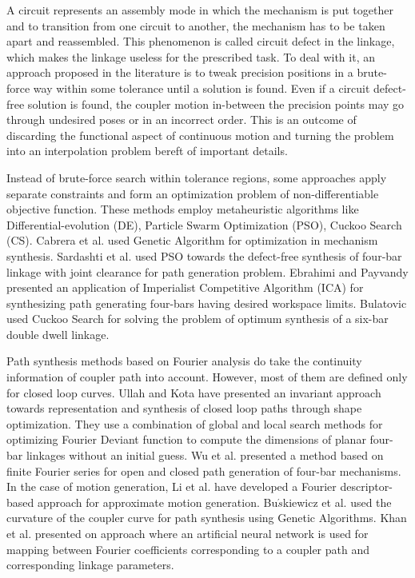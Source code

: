 A circuit represents an assembly mode in which the mechanism is put together and to transition from one circuit to another, the mechanism has to be taken apart and reassembled. This phenomenon is called circuit defect in the linkage, which makes the linkage useless for the prescribed task.
To deal with it, an approach proposed in the literature is to tweak precision positions in a brute-force way within some tolerance until a solution is found.
Even if a circuit defect-free solution is found, the coupler motion in-between the precision points may go through undesired poses or in an incorrect order. This is an outcome of discarding the functional aspect of continuous motion and turning the problem into an interpolation problem bereft of important details.

Instead of brute-force search within tolerance regions, some approaches apply separate constraints and form an optimization problem of non-differentiable objective function.
These methods employ metaheuristic algorithms like Differential-evolution (DE), Particle Swarm Optimization (PSO), Cuckoo Search (CS). Cabrera et al.\cite{Cabrera2002} used Genetic Algorithm for optimization in mechanism synthesis. Sardashti et al.\cite{sardashti2013} used PSO towards the defect-free synthesis of four-bar linkage with joint clearance for path generation problem. Ebrahimi and Payvandy\cite{Ebrahimi2015} presented an application of Imperialist Competitive Algorithm (ICA) for synthesizing path generating four-bars having desired workspace limits. Bulatovic\cite{Bulatovic2013} used Cuckoo Search for solving the problem of optimum synthesis of a six-bar double dwell linkage.

Path synthesis methods based on Fourier analysis do take the continuity information of coupler path into account.
However, most of them are defined only for closed loop curves.
Ullah and Kota\cite{ullah1997} have presented an invariant approach towards representation and synthesis of closed loop paths through shape optimization.
They use a combination of global and local search methods for optimizing Fourier Deviant function to compute the dimensions of planar four-bar linkages without an initial guess.
Wu et al.\cite{wu2011} presented a method based on finite Fourier series for open and closed path generation of four-bar mechanisms.
In the case of motion generation, Li et al.\cite{li2016} have developed a Fourier descriptor-based approach for approximate motion generation.
Bu$\acute{s}$kiewicz et al.\cite{Buskiewicz2009} used the curvature of the coupler curve for path synthesis using Genetic Algorithms.
Khan et al.\cite{khan2015} presented on approach where an artificial neural network is used for mapping between Fourier coefficients corresponding to a coupler path and corresponding linkage parameters.

